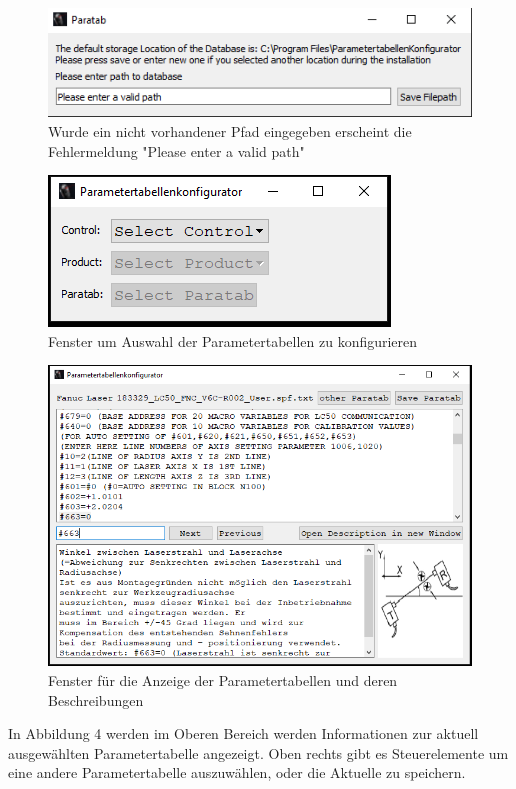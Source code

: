 \documentclass[12pt,a4paper]{article}
\begin{document}
\begin{figure}[H]
\includegraphics[scale=1]{pictures_and_research/Bilder/errorFilePathW.PNG}
\caption{Wurde ein nicht vorhandener Pfad eingegeben erscheint die Fehlermeldung "Please enter a valid path"}
\end{figure}
\begin{figure}[H]
\includegraphics[scale=1]{pictures_and_research/Bilder/configW.PNG}
\caption{Fenster um Auswahl der Parametertabellen zu konfigurieren}
\end{figure}
\begin{figure}[H]
\includegraphics[scale=0.75]{pictures_and_research/Bilder/paratabW.PNG}
\caption{Fenster für die Anzeige der Parametertabellen und deren Beschreibungen}
\end{figure}
\noindent
In Abbildung 4 werden im Oberen Bereich werden Informationen zur aktuell ausgewählten Parametertabelle angezeigt. Oben rechts gibt es Steuerelemente um eine andere Parametertabelle auszuwählen, oder die Aktuelle zu speichern.\\
\end{document}
